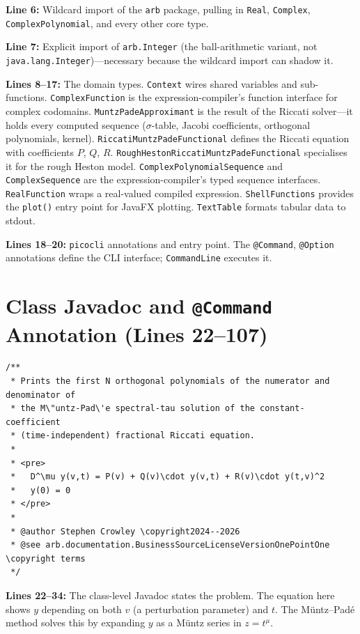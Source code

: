 \documentclass[a4paper,11pt]{article}
\begin{document}
\textbf{Line 6:} Wildcard import of the \texttt{arb} package, pulling in
\texttt{Real}, \texttt{Complex}, \texttt{ComplexPolynomial}, and every other
core type.

\textbf{Line 7:} Explicit import of \texttt{arb.Integer} (the ball-arithmetic
variant, not \texttt{java.lang.Integer})---necessary because the wildcard
import can shadow it.

\textbf{Lines 8--17:} The domain types. \texttt{Context} wires shared variables
and sub-functions. \texttt{ComplexFunction} is the expression-compiler's
function interface for complex codomains.
\texttt{MuntzPadeApproximant} is the result of the Riccati solver---it holds
every computed sequence ($\sigma$-table, Jacobi coefficients, orthogonal
polynomials, kernel). \texttt{RiccatiMuntzPadeFunctional} defines the Riccati
equation with coefficients $P$, $Q$, $R$. \texttt{RoughHestonRiccatiMuntzPadeFunctional}
specialises it for the rough Heston model. \texttt{ComplexPolynomialSequence}
and \texttt{ComplexSequence} are the expression-compiler's typed sequence
interfaces. \texttt{RealFunction} wraps a real-valued compiled expression.
\texttt{ShellFunctions} provides the \texttt{plot()} entry point for JavaFX
plotting. \texttt{TextTable} formats tabular data to stdout.

\textbf{Lines 18--20:} \texttt{picocli} annotations and entry point. The
\texttt{@Command}, \texttt{@Option} annotations define the CLI interface;
\texttt{CommandLine} executes it.

\section{Class Javadoc and \texttt{@Command} Annotation (Lines 22--107)}

\begin{lstlisting}[firstnumber=22]
/**
 * Prints the first N orthogonal polynomials of the numerator and denominator of
 * the M\"untz-Pad\'e spectral-tau solution of the constant-coefficient
 * (time-independent) fractional Riccati equation.
 *
 * <pre>
 *   D^\mu y(v,t) = P(v) + Q(v)\cdot y(v,t) + R(v)\cdot y(t,v)^2
 *   y(0) = 0
 * </pre>
 *
 * @author Stephen Crowley \copyright2024--2026
 * @see arb.documentation.BusinessSourceLicenseVersionOnePointOne \copyright terms
 */
\end{lstlisting}

\textbf{Lines 22--34:} The class-level Javadoc states the problem. The equation
here shows $y$ depending on both $v$ (a perturbation parameter) and $t$. The
M\"untz--Pad\'e method solves this by expanding $y$ as a M\"untz series in
$z = t^{\mu}$.
\end{document}
